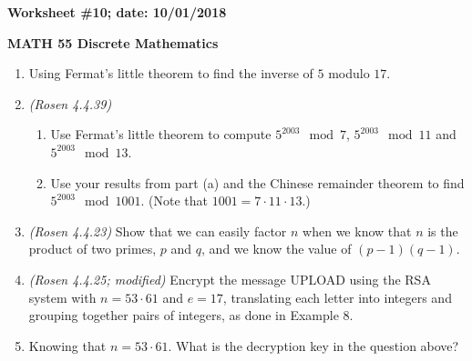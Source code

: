 \documentclass{article}
\begin{document}
{\bf Worksheet \#10; date: 10/01/2018}

{\bf MATH 55 Discrete Mathematics}

\begin{enumerate}
\item Using Fermat's little theorem to find the inverse of $5$ modulo $17$.

\item {\em (Rosen 4.4.39)}
\begin{enumerate}
\item Use Fermat's little theorem to compute $5^{2003} \mod 7$, $5^{2003} \mod 11$ and $5^{2003} \mod 13$.
\item Use your results from part (a) and the Chinese remainder theorem to find $5^{2003} \mod 1001$. (Note that $1001 = 7 \cdot 11 \cdot 13$.)
\end{enumerate}

\item {\em (Rosen 4.4.23)} Show that we can easily factor $n$ when we know that $n$ is the product of two primes, $p$ and $q$, and we know the value of $(p-1)(q-1)$.

\item {\em (Rosen 4.4.25; modified)} Encrypt the message UPLOAD using the RSA system with $n = 53 \cdot 61$ and $e = 17$, translating each letter into integers and grouping together pairs of integers, as done in Example 8.

\item Knowing that $n = 53 \cdot 61$. What is the decryption key in the question above?
\end{enumerate}
\end{document}
